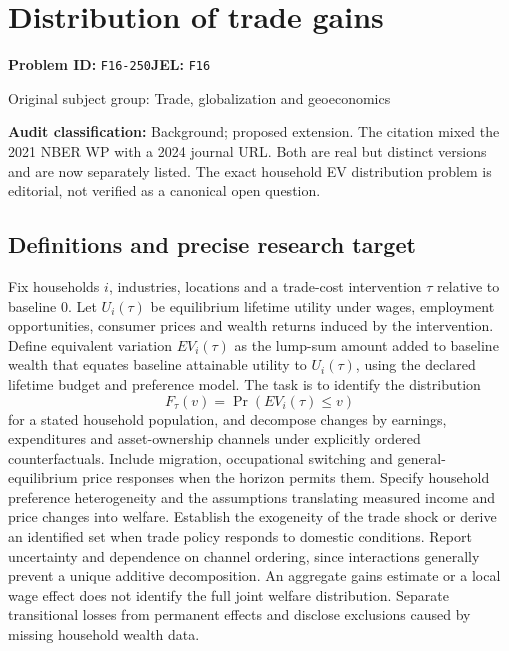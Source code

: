 \documentclass[11pt,a4paper]{article}
\begin{document}
\section*{Distribution of trade gains}
\textbf{Problem ID:} \texttt{F16-250}\quad \textbf{JEL:} \texttt{F16}\par
\label{problem:OP-0340}
{\sffamily\small\color{muted}Original subject group: Trade, globalization and geoeconomics\par}
\label{definitions:problem:30007622}
\textbf{Audit classification:} Background; proposed extension. The citation mixed the 2021 NBER WP with a 2024 journal URL. Both are real but distinct versions and are now separately listed. The exact household EV distribution problem is editorial, not verified as a canonical open question.
\subsection*{Definitions and precise research target}
Fix households \(i\), industries, locations and a trade-cost intervention \(\tau\) relative to baseline \(0\). Let \(U_i(\tau)\) be equilibrium lifetime utility under wages, employment opportunities, consumer prices and wealth returns induced by the intervention. Define equivalent variation \(EV_i(\tau)\) as the lump-sum amount added to baseline wealth that equates baseline attainable utility to \(U_i(\tau)\), using the declared lifetime budget and preference model. The task is to identify the distribution
\[F_{\tau}(v)=\Pr(EV_i(\tau)\leq v)\]
for a stated household population, and decompose changes by earnings, expenditures and asset-ownership channels under explicitly ordered counterfactuals. Include migration, occupational switching and general-equilibrium price responses when the horizon permits them. Specify household preference heterogeneity and the assumptions translating measured income and price changes into welfare. Establish the exogeneity of the trade shock or derive an identified set when trade policy responds to domestic conditions. Report uncertainty and dependence on channel ordering, since interactions generally prevent a unique additive decomposition. An aggregate gains estimate or a local wage effect does not identify the full joint welfare distribution. Separate transitional losses from permanent effects and disclose exclusions caused by missing household wealth data.
\end{document}
